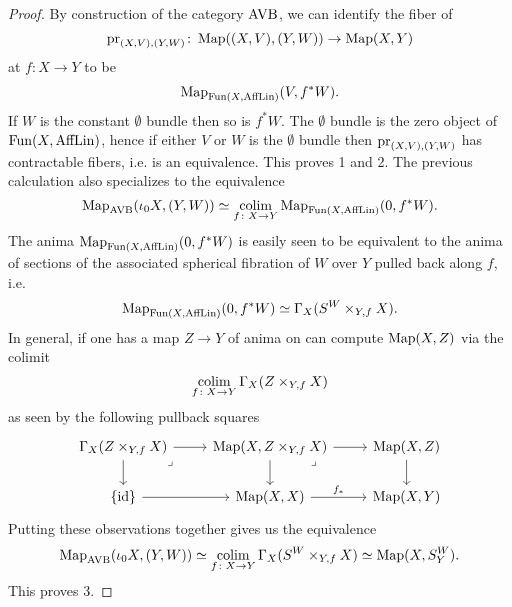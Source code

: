 \begin{proof}
    By construction of the category $\operatorname{AVB}$, we can identify the fiber of 
    \[
      \mathrm{pr}_{(X,V),(Y,W)} \colon \operatorname{Map}((X,V), (Y,W)) \to \operatorname{Map}(X,Y)
    \]
    at $f \colon X \to Y$ to be 
    \[
      \operatorname{Map}_{\operatorname{Fun}(X,\operatorname{AffLin})}(V, f^* W).  
    \]
    If $W$ is the constant $\emptyset$ bundle then so is $f^* W$.
    The $\emptyset$ bundle is the zero object of $\operatorname{Fun}(X,\operatorname{AffLin})$, hence if either 
    $V$ or $W$ is the $\emptyset$ bundle then $\mathrm{pr}_{(X,V),(Y,W)}$ has contractable fibers, i.e. is an equivalence.
    This proves 1 and 2. 
    The previous calculation also specializes to the equivalence 
    \[
    \operatorname{Map}_{\operatorname{AVB}}(\iota_0 X, (Y,W)) \simeq \operatorname*{colim}_{f \colon X \to Y} \operatorname{Map}_{\operatorname{Fun}(X,\operatorname{AffLin})}(0,f^* W).    
    \]
    The anima $\operatorname{Map}_{\operatorname{Fun}(X,\operatorname{AffLin})}(0,f^* W)$ is easily seen to be equivalent to the anima of sections of 
    the associated spherical fibration of $W$ over $Y$ pulled back along $f$, i.e. 
    \[
    \operatorname{Map}_{\operatorname{Fun}(X,\operatorname{AffLin})}(0,f^* W) \simeq \Gamma_X( S^W \times_{Y, f} X).
    \]
    In general, if one has a map $Z \to Y$ of anima on can compute 
    $\operatorname{Map}(X,Z)$ via the colimit
    \[
      \operatorname*{colim}_{f \colon X \to Y} \Gamma_X( Z \times_{Y, f} X)  
    \]
    as seen by the following pullback squares 
    \[\begin{tikzcd}
        {\Gamma_X(Z \times_{Y,f}X)} & {\Map(X,Z\times_{Y,f}X)} & {\Map(X,Z)} \\
        {\{\id\}} & {\Map(X,X)} & {\Map(X,Y)}
        \arrow[from=1-1, to=2-1]
        \arrow[from=1-1, to=1-2]
        \arrow[from=1-2, to=2-2]
        \arrow[from=2-1, to=2-2]
        \arrow[from=1-2, to=1-3]
        \arrow[from=1-3, to=2-3]
        \arrow["{f_*}", from=2-2, to=2-3]
        \arrow["\lrcorner"{anchor=center, pos=0.125}, draw=none, from=1-2, to=2-3]
        \arrow["\lrcorner"{anchor=center, pos=0.125}, draw=none, from=1-1, to=2-2]
    \end{tikzcd}\]
    Putting these observations together gives us the equivalence 
    \[
        \operatorname{Map}_{\operatorname{AVB}}(\iota_0 X, (Y,W)) \simeq  \operatorname*{colim}_{f \colon X \to Y} \Gamma_X( S^W \times_{Y, f} X)  \simeq \operatorname{Map}(X,S^W_Y).
    \]
    This proves 3.
\end{proof}

